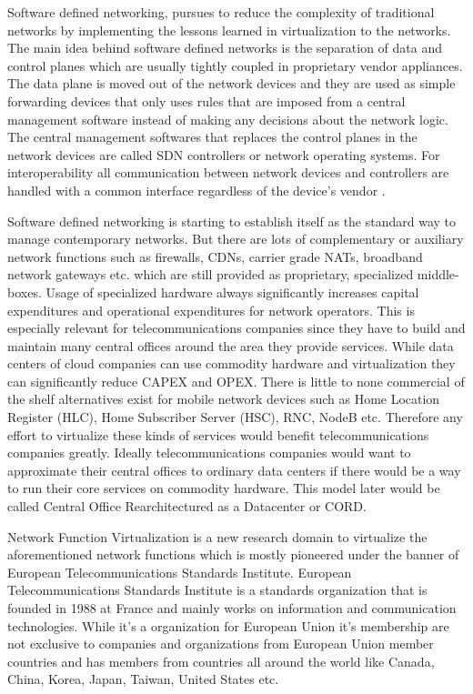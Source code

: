 \documentclass[12pt,oneandhalf,chaparabic,ceng,ms,eng,oneside,pntc]{gsufbe}
\begin{document}
Software defined networking, pursues to reduce the complexity of traditional networks by implementing 
the lessons learned in virtualization to the networks. The main idea behind software defined networks
is the separation of data and control planes which are usually tightly coupled in proprietary vendor
appliances. The data plane is moved out of the network devices and they are used as simple forwarding
devices that only uses rules that are imposed from a central management software instead of making any
decisions about the network logic. The central management softwares that replaces the control planes in
the network devices are called SDN controllers or network operating systems. For interoperability all
communication between network devices and controllers are handled with a common interface regardless of
the device's vendor \cite{li_software_defined_2015}.

Software defined networking is starting to establish itself as the standard way to manage contemporary
networks. But there are lots of complementary or auxiliary network functions such as firewalls, CDNs,
carrier grade NATs, broadband network gateways etc. which are still provided as proprietary,
specialized middle-boxes. Usage of specialized hardware always significantly increases capital
expenditures and operational expenditures for network operators. This is especially relevant for
telecommunications companies since they have to build and maintain many central offices around
the area they provide services. While data centers of cloud companies can use commodity hardware and
virtualization they can significantly reduce CAPEX and OPEX. There is little to none commercial of the
shelf alternatives exist for mobile network devices such as Home Location Register (HLC), Home
Subscriber Server (HSC), RNC, NodeB etc. \cite{khalid_standardized_2016} Therefore any effort to 
virtualize these kinds of services
would benefit telecommunications companies greatly. Ideally telecommunications
companies would want to
approximate their central offices to ordinary data centers if there would be a way to run their core
services on commodity hardware. This model later would be called Central Office Rearchitectured as a
Datacenter or CORD.

Network Function Virtualization is a new research domain to virtualize the aforementioned network
functions which is mostly pioneered under the banner of European Telecommunications Standards
Institute. European Telecommunications Standards Institute \cite{etsi} is a standards organization
that is
founded in 1988 at France and mainly works on information and communication technologies. While it's a
organization for European Union it's membership are not exclusive to companies and organizations from
European Union member countries and has members from countries all around the world like Canada, China,
Korea, Japan, Taiwan, United States etc.
\end{document}
